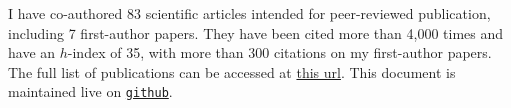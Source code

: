 I have co-authored 83 scientific articles intended for peer-reviewed 
publication, including 7 first-author papers. They have been cited more than 
4,000 times and have an $h$-index of 35, with more than 300 citations on my 
first-author papers. The full list of 
publications can be accessed at \href{https://goo.gl/LAu9G4}{this url}. 
%
This document is maintained live on
\href{https://github.com/cristobal-sifon/cv/blob/master/Sifon_publications.pdf}{\texttt{github}}.

